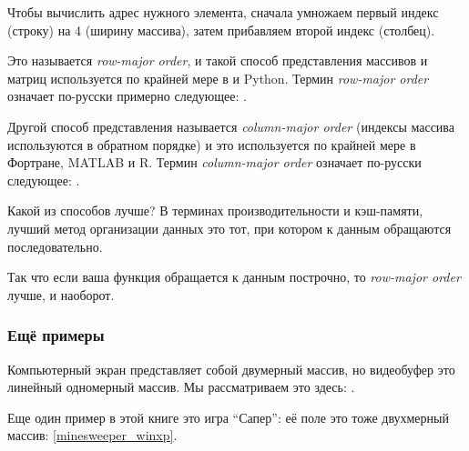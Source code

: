 Чтобы вычислить адрес нужного элемента, сначала умножаем первый индекс (строку) на 4 (ширину массива), 
затем прибавляем второй индекс (столбец).

Это называется \emph{row-major order}, 
и такой способ представления массивов и матриц используется по крайней мере в \CCpp и Python. 
Термин \emph{row-major order} означает по-русски примерно следующее: .

Другой способ представления называется \emph{column-major order} (индексы массива используются в обратном порядке) 
и это используется по крайней мере в Фортране, MATLAB и R. 
Термин \emph{column-major order} означает по-русски
следующее: .

Какой из способов лучше?
В терминах производительности и кэш-памяти, лучший метод организации данных это тот,
при котором к данным обращаются последовательно.

Так что если ваша функция обращается к данным построчно, то \emph{row-major order} лучше,
и наоборот.





\subsubsection{Ещё примеры}

Компьютерный экран представляет собой двумерный массив, но видеобуфер это линейный
одномерный массив. 
Мы рассматриваем это здесь: .

Еще один пример в этой книге это игра ``Сапер'': её поле это тоже двухмерный массив: \ref{minesweeper_winxp}.

